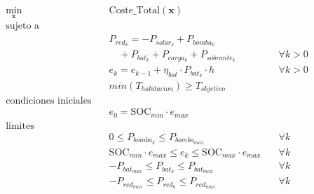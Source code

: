 \begin{align}
	\min_{\mathbf{x}} \quad & \text{Coste\_Total}(\mathbf{x})                                                                                                            \\
	\text{sujeto a} \quad   & \nonumber                                                                                                                                  \\
	                        & P_{red_k} = -P_{solar_k} + P_{bomba_k}  \nonumber                                                                                          \\
	                        & \quad + P_{bat_k} + P_{carga_k} + P_{sobrante_k} \quad                                                                     & \forall k > 0 \\
	                        & e_k = e_{k-1} + \eta_{bat} \cdot P_{bat_k} \cdot h \quad                                                                   & \forall k > 0 \\
	                        & min(T_{habitacion}) \geq T_{objetivo}                                               \label{eq:min_t_habitacion_constraint}                 \\
	\text{condiciones iniciales} \quad \nonumber                                                                                                                         \\
	                        & e_0 = \text{SOC}_{min} \cdot e_{max}                                                                                                       \\
	\text{límites} \quad    & \nonumber                                                                                                                                  \\
	                        & 0 \leq P_{bomba_k} \leq P_{bomba_{max}} \quad                                                                              & \forall k     \\
	                        & \text{SOC}_{min} \cdot e_{max} \leq e_k \leq \text{SOC}_{max} \cdot e_{max} \quad                                          & \forall k     \\
	                        & -P_{bat_{max}} \leq P_{bat_k} \leq P_{bat_{max}} \quad                                                                     & \forall k     \\
	                        & -P_{red_{max}} \leq P_{red_k} \leq P_{red_{max}} \quad                                                                     & \forall k     \\

\end{align}
